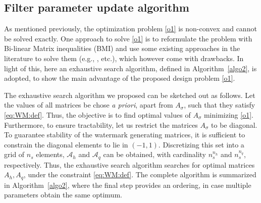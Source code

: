 \subsection{Filter parameter update algorithm}\label{ch:design:algo}
As mentioned previously, the optimization problem \eqref{o1} is non-convex and cannot be solved exactly. %
One approach to solve \eqref{o1} is to reformulate the problem with Bi-linear Matrix inequalities (BMI) and use some existing approaches in the literature to solve them (e.g., \cite{gallo2021design,dehnert2021less,dinh2011combining}, etc.), which however come with drawbacks. In light of this, here an exhaustive search algorithm, defined in Algorithm~\ref{algo2}, is adopted, to show the main advantage of the proposed design problem \eqref{o1}.
%
%

The exhaustive search algorithm we proposed can be sketched out as follows. Let the values of all matrices be chose \textit{a priori}, apart from $A_\sigma$, such that they satisfy \eqref{eq:WM:def}.
Thus, the objective is to find optimal values of $A_\sigma$ minimizing \eqref{o1}. Furthermore, to ensure tractability, let us restrict the matrices $A_\sigma$ to be diagonal. To guarantee stability of the watermark generating matrices, it is sufficient to constrain the diagonal elements to lie in $(-1,1)$.
Discretizing this set into a grid of $n_s$ elements, $\mathcal A_h$ and $\mathcal A_q$ can be obtained, with cardinality $n_s^{n_h}$ and $n_s^{n_q}$, respectively.
Thus, the exhaustive search algorithm searches for optimal matrices $A_h, A_q$, under the constraint \eqref{eq:WM:def}.
The complete algorithm is summarized in Algorithm~\ref{algo2}, where the final step provides an ordering, in case multiple parameters obtain the same optimum.

